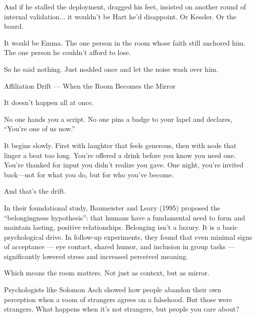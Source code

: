 And if he stalled the deployment, dragged his feet, insisted on another round of internal validation... 
it wouldn’t be Hart he’d disappoint. Or Kessler. Or the board.

It would be Emma.
The one person in the room whose faith still anchored him.
The one person he couldn’t afford to lose.

So he said nothing. Just nodded once and let the noise wash over him.

\medskip

\begin{PsychologicalSidebar}{Affiliation Drift --- When the Room Becomes the Mirror}

    It doesn’t happen all at once.
    
    \medskip
    
    No one hands you a script. No one pins a badge to your lapel and declares, “You’re one of us now.”
    
    \medskip
    
    It begins slowly. First with laughter that feels generous, then with nods that linger a beat too long.
    You’re offered a drink before you know you need one. You're thanked for input you didn’t realize you gave.
    One night, you're invited back—not for what you do, but for who you’ve become.
    
    \medskip
    
    And that’s the drift.
    
    \medskip
    
    In their foundational study, Baumeister and Leary (1995) proposed the “belongingness hypothesis”: 
    that humans have a fundamental need to form and maintain lasting, positive relationships. Belonging 
    isn’t a luxury. It is a basic psychological drive. In follow-up experiments, they found that even 
    minimal signs of acceptance --- eye contact, shared humor, and inclusion in group tasks --- significantly 
    lowered stress and increased perceived meaning.
    
    \medskip
    
    Which means the room matters.
    Not just as context, but as mirror.
    
    \medskip
    
    Psychologists like Solomon Asch showed how people abandon their own perception when a room of 
    strangers agrees on a falsehood. But those were strangers. What happens when it’s not strangers, 
    but people you care about?
    

\end{PsychologicalSidebar}

